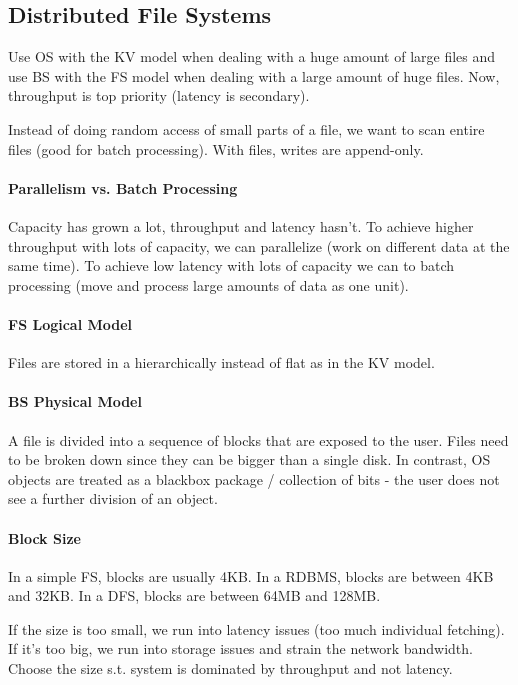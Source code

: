 \subsection{Distributed File Systems}

Use OS with the KV model when dealing with a huge amount of large files and use BS with the FS model when dealing with a large amount of huge files. Now, throughput is top priority (latency is secondary).

Instead of doing random access of small parts of a file, we want to scan entire files (good for batch processing). With files, writes are append-only.


\paragraph{Parallelism vs. Batch Processing}
Capacity has grown a lot, throughput and latency hasn't. To achieve higher throughput with lots of capacity, we can parallelize (work on different data at the same time). To achieve low latency with lots of capacity we can to batch processing (move and process large amounts of data as one unit).

\paragraph{FS Logical Model}
Files are stored in a hierarchically instead of flat as in the KV model. %

\paragraph{BS Physical Model}
A file is divided into a sequence of blocks that are exposed to the user. Files need to be broken down since they can be bigger than a single disk. In contrast, OS objects are treated as a blackbox package / collection of bits - the user does not see a further division of an object.

\paragraph{Block Size}
In a simple FS, blocks are usually 4KB. In a RDBMS, blocks are between 4KB and 32KB. In a DFS, blocks are between 64MB and 128MB.

If the size is too small, we run into latency issues (too much individual fetching). If it's too big, we run into storage issues and strain the network bandwidth. Choose the size s.t. system is dominated by throughput and not latency.

